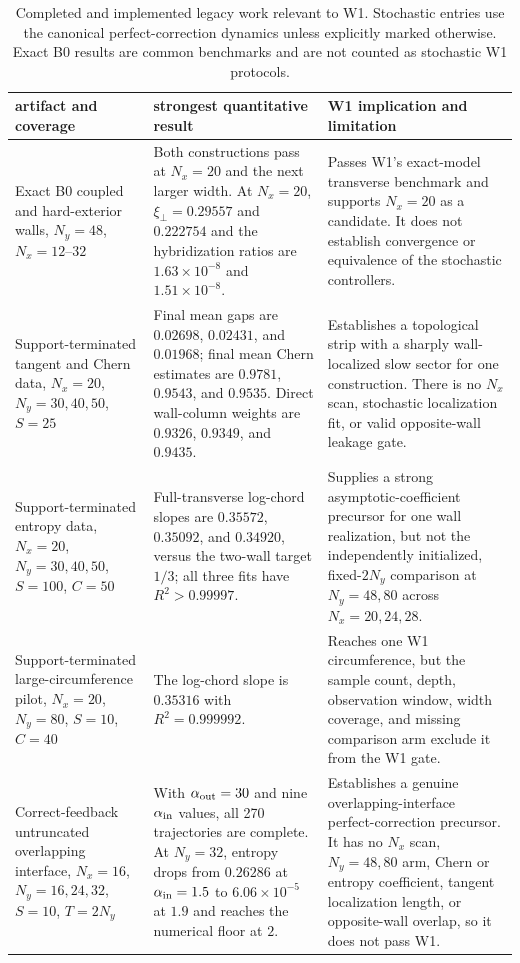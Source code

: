\documentclass[aps,prx,twocolumn,floatfix,nofootinbib,superscriptaddress,longbibliography]{revtex4-2}
\newcommand{\campaignTableSetup}{%
  \footnotesize
  \setlength{\tabcolsep}{4pt}%
  \renewcommand{\arraystretch}{1.12}%
}
\begin{document}
\begin{table}[t]
\campaignTableSetup
\caption{Completed and implemented legacy work relevant to W1.  Stochastic entries use
the canonical perfect-correction dynamics unless explicitly marked otherwise.  Exact
B0 results are common benchmarks and are not counted as stochastic W1 protocols.}
\label{tab:W1-legacy}
\begin{tabularx}{\textwidth}{@{}L{0.75}L{1.10}L{1.15}@{}}
\toprule
artifact and coverage & strongest quantitative result & W1 implication and limitation \\
\midrule
Exact B0 coupled and hard-exterior walls, $N_y=48$, $N_x=12$--$32$
& Both constructions pass at $N_x=20$ and the next larger width.  At $N_x=20$,
$\xi_\perp=0.29557$ and $0.222754$ and the hybridization ratios are
$1.63\times10^{-8}$ and $1.51\times10^{-8}$.
& Passes W1's exact-model transverse benchmark and supports $N_x=20$ as a candidate.
It does not establish convergence or equivalence of the stochastic controllers. \\
Support-terminated tangent and Chern data, $N_x=20$, $N_y=30,40,50$, $S=25$
& Final mean gaps are $0.02698$, $0.02431$, and $0.01968$; final mean Chern estimates
are $0.9781$, $0.9543$, and $0.9535$.  Direct wall-column weights are $0.9326$,
$0.9349$, and $0.9435$.
& Establishes a topological strip with a sharply wall-localized slow sector for one
construction.  There is no $N_x$ scan, stochastic localization fit, or valid
opposite-wall leakage gate. \\
Support-terminated entropy data, $N_x=20$, $N_y=30,40,50$, $S=100$, $C=50$
& Full-transverse log-chord slopes are $0.35572$, $0.35092$, and $0.34920$, versus the
two-wall target $1/3$; all three fits have $R^2>0.99997$.
& Supplies a strong asymptotic-coefficient precursor for one wall realization, but not
the independently initialized, fixed-$2N_y$ comparison at $N_y=48,80$ across
$N_x=20,24,28$. \\
Support-terminated large-circumference pilot, $N_x=20$, $N_y=80$, $S=10$, $C=40$
& The log-chord slope is $0.35316$ with $R^2=0.999992$.
& Reaches one W1 circumference, but the sample count, depth, observation window, width
coverage, and missing comparison arm exclude it from the W1 gate. \\
Correct-feedback untruncated overlapping interface, $N_x=16$, $N_y=16,24,32$, $S=10$,
$T=2N_y$
& With $\alpha_{\rm out}=30$ and nine $\alpha_{\rm in}$ values, all 270 trajectories are
complete.  At $N_y=32$, entropy drops from $0.26286$ at $\alpha_{\rm in}=1.5$ to
$6.06\times10^{-5}$ at $1.9$ and reaches the numerical floor at $2$.
& Establishes a genuine overlapping-interface perfect-correction precursor.  It has no
$N_x$ scan, $N_y=48,80$ arm, Chern or entropy coefficient, tangent localization length,
or opposite-wall overlap, so it does not pass W1. \\
\bottomrule
\end{tabularx}
\end{table}
\end{document}
